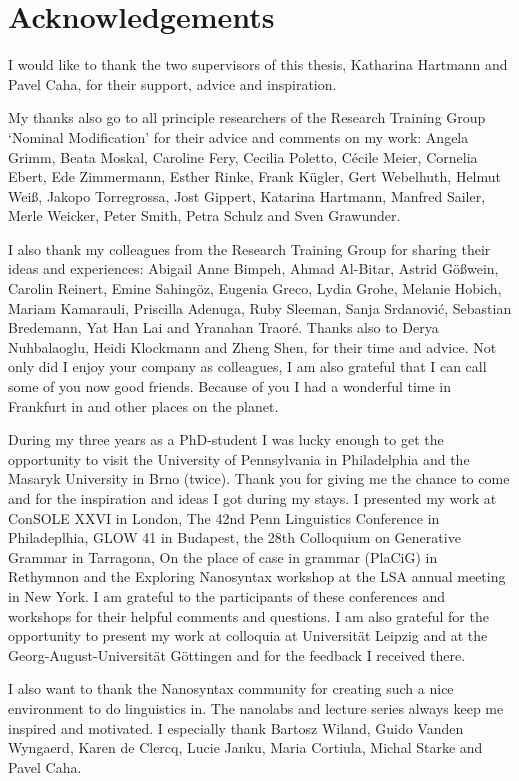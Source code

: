 
\chapter*[Acknowledgements]{Acknowledgements}

I would like to thank the two supervisors of this thesis, Katharina Hartmann and Pavel Caha, for their support, advice and inspiration.

My thanks also go to all principle researchers of the Research Training Group `Nominal Modification' for their advice and comments on my work:
Angela Grimm,
Beata Moskal,
Caroline Fery,
Cecilia Poletto,
Cécile Meier,
Cornelia Ebert,
Ede Zimmermann,
Esther Rinke,
Frank Kügler,
Gert Webelhuth,
Helmut Weiß,
Jakopo Torregrossa,
Jost Gippert,
Katarina Hartmann,
Manfred Sailer,
Merle Weicker,
Peter Smith,
Petra Schulz and
Sven Grawunder.

I also thank my colleagues from the Research Training Group for sharing their ideas and experiences:
Abigail Anne Bimpeh,
Ahmad Al-Bitar,
Astrid Gößwein,
Carolin Reinert,
Emine Sahingöz,
Eugenia Greco,
Lydia Grohe,
Melanie Hobich,
Mariam Kamarauli,
Priscilla Adenuga,
Ruby Sleeman,
Sanja Srdanović,
Sebastian Bredemann,
Yat Han Lai and
Yranahan Traoré.
Thanks also to
Derya Nuhbalaoglu,
Heidi Klockmann and
Zheng Shen,
for their time and advice.
Not only did I enjoy your company as colleagues, I am also grateful that I can call some of you now good friends.
Because of you I had a wonderful time in Frankfurt in and other places on the planet.

During my three years as a PhD-student I was lucky enough to get the opportunity to visit the University of Pennsylvania in Philadelphia and the Masaryk University in Brno (twice). Thank you for giving me the chance to come and for the inspiration and ideas I got during my stays.
I presented my work at
ConSOLE XXVI in London,
The 42nd Penn Linguistics Conference in Philadeplhia,
GLOW 41 in Budapest,
the 28th Colloquium on Generative Grammar in Tarragona,
On the place of case in grammar (PlaCiG) in Rethymnon and
the Exploring Nanosyntax workshop at the LSA annual meeting in New York.
I am grateful to the participants of these conferences and workshops for their helpful comments and questions.
I am also grateful for the opportunity to present my work at colloquia at Universität Leipzig and at the Georg-August-Universität Göttingen and for the feedback I received there.

I also want to thank the Nanosyntax community for creating such a nice environment to do linguistics in.
The nanolabs and lecture series always keep me inspired and motivated.
I especially thank
Bartosz Wiland,
Guido Vanden Wyngaerd,
Karen de Clercq,
Lucie Janku,
Maria Cortiula,
Michal Starke and
Pavel Caha.

